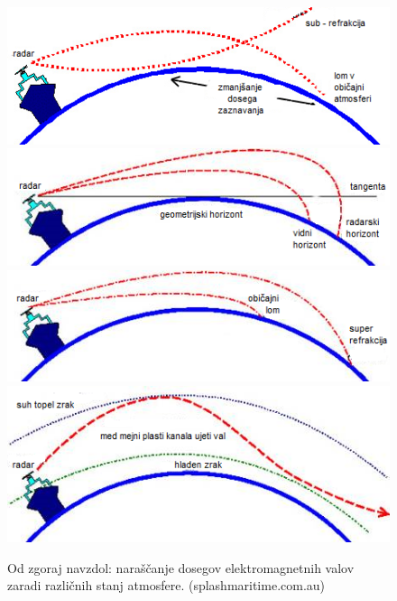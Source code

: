 \begin{figure}
	\centering
	\includegraphics[width=\textwidth]{Predavanja/01_Uvod/figs/Subrefraction.png}
	\includegraphics[width=\textwidth]{Predavanja/01_Uvod/figs/OpticniRadarskiHorizont.png}	
	\includegraphics[width=\textwidth]{Predavanja/01_Uvod/figs/RefractionSuperrefraction.png}
	\includegraphics[width=\textwidth]{Predavanja/01_Uvod/figs/Valovod.png}	
	\caption{Od zgoraj navzdol: naraščanje dosegov elektromagnetnih valov zaradi različnih stanj atmosfere. (splashmaritime.com.au)}
	\label{fig:LomiAtmosfera}       
\end{figure}


